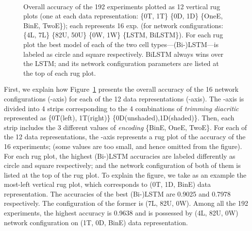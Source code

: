 \documentclass[journal,10pt,twocolumns,letter]{IEEEtran}
\begin{document}
\begin{figure}[!tb]



   \caption{Overall accuracy of the 192 experiments plotted as 12 vertical rug plots (one at each
    data representation: \{0T, 1T\}  \{0D, 1D\}  \{OneE, BinE, TwoE\}); each
    represents 16 exp. (for network configurations: \{4L, 7L\}  \{82U, 50U\}  \{0W,
    1W\}  \{LSTM, BiLSTM\}). For each rug plot the best model of each of the two cell
    types---(Bi-)LSTM---is labeled as circle and square respectively. BiLSTM always wins over the
    LSTM; and its network configuration parameters are listed at the top of each rug
    plot.}~\label{fig:ArabicModelsResults}
\end{figure}
First, we explain how Figure~\ref{fig:ArabicModelsResults} presents the overall accuracy of the
16 network configurations (-axis) for each of the 12 data representations (-axis). The
-axis is divided into 4 strips corresponding to the 4 combinations of \textit{trimming} 
\textit{diacritic} represented as \{0T(left), 1T(right)\} 
\{0D(unshaded),1D(shaded)\}. Then, each strip includes the 3 different values of \textit{encoding}
\{BinE, OneE, TwoE\}. For each of the 12 data representations, the
-axis represents a rug plot of the
accuracy of the 16 experiments; (some values are too small, and hence omitted from the
figure)\@. For each rug plot, the highest (Bi-)LSTM accuracies are labeled differently as circle and
square respectively; and the network configuration of both of them is listed at the top of the rug
plot. To explain the figure, we take as an example the most-left vertical rug plot, which
corresponds to (0T, 1D, BinE) data representation. The accuracies of the best (Bi-)LSTM are 0.9025 and
0.7978 respectively. The configuration of the former is (7L, 82U, 0W). Among all the 192
experiments, the highest
accuracy is 0.9638 and is possessed by (4L, 82U, 0W) network configuration on (1T, 0D, BinE) data
representation.
\end{document}
